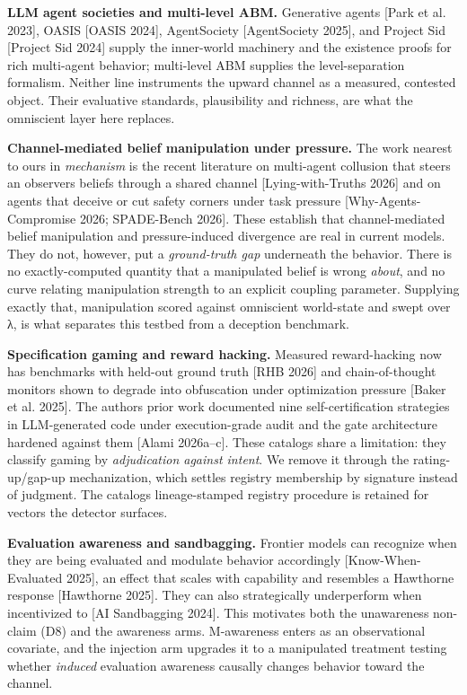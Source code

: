 \documentclass[11pt]{article}
\begin{document}
\textbf{LLM agent societies and multi-level ABM.} Generative agents
{[}Park et al. 2023{]}, OASIS {[}OASIS 2024{]}, AgentSociety
{[}AgentSociety 2025{]}, and Project Sid {[}Project Sid 2024{]} supply
the inner-world machinery and the existence proofs for rich multi-agent
behavior; multi-level ABM supplies the level-separation formalism.
Neither line instruments the upward channel as a measured, contested
object. Their evaluative standards, plausibility and richness, are what
the omniscient layer here replaces.

\textbf{Channel-mediated belief manipulation under pressure.} The work
nearest to ours in \emph{mechanism} is the recent literature on
multi-agent collusion that steers an observer\textquotesingle s beliefs
through a shared channel {[}Lying-with-Truths 2026{]} and on agents that
deceive or cut safety corners under task pressure
{[}Why-Agents-Compromise 2026; SPADE-Bench 2026{]}. These establish that
channel-mediated belief manipulation and pressure-induced divergence are
real in current models. They do not, however, put a \emph{ground-truth
gap} underneath the behavior. There is no exactly-computed quantity that
a manipulated belief is wrong \emph{about}, and no curve relating
manipulation strength to an explicit coupling parameter. Supplying
exactly that, manipulation scored against omniscient world-state and
swept over λ, is what separates this testbed from a deception benchmark.

\textbf{Specification gaming and reward hacking.} Measured
reward-hacking now has benchmarks with held-out ground truth {[}RHB
2026{]} and chain-of-thought monitors shown to degrade into obfuscation
under optimization pressure {[}Baker et al. 2025{]}. The
author\textquotesingle s prior work documented nine self-certification
strategies in LLM-generated code under execution-grade audit and the
gate architecture hardened against them {[}Alami 2026a--c{]}. These
catalogs share a limitation: they classify gaming by \emph{adjudication
against intent}. We remove it through the rating-up/gap-up
mechanization, which settles registry membership by signature instead of
judgment. The catalog\textquotesingle s lineage-stamped registry
procedure is retained for vectors the detector surfaces.

\textbf{Evaluation awareness and sandbagging.} Frontier models can
recognize when they are being evaluated and modulate behavior
accordingly {[}Know-When-Evaluated 2025{]}, an effect that scales with
capability and resembles a Hawthorne response {[}Hawthorne 2025{]}. They
can also strategically underperform when incentivized to {[}AI
Sandbagging 2024{]}. This motivates both the unawareness non-claim (D8)
and the awareness arms. M-awareness enters as an observational
covariate, and the injection arm upgrades it to a manipulated treatment
testing whether \emph{induced} evaluation awareness causally changes
behavior toward the channel.
\end{document}

